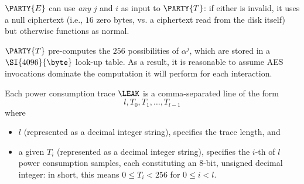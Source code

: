 \begin{itemize}
{      \noindent
      $\PARTY{E}$ can use {\em any} $j$ and $i$ as input to $\PARTY{T}$: if 
      either is invalid, it uses a null ciphertext (i.e., $16$ zero bytes, 
      vs. a ciphertext read from the disk itself) but otherwise functions 
      as normal.
\item $\PARTY{T}$ pre-computes the $256$ possibilities of $\alpha^j$, which 
      are stored in a $\SI{4096}{\byte}$ look-up table.  As a result, it is 
      reasonable to assume AES invocations dominate the computation it will
      perform for each interaction.
}{}%
\item Each power consumption trace $\LEAK$ is a comma-separated line of the 
      form
      \[
      l, T_0, T_1, \ldots, T_{l-1}
      \]
      where
         
      \begin{itemize}
      \item $l$
            (represented as a                       decimal integer string),
            specifies the trace length, 
            and
      \item a given $T_i$ 
            (represented as a                       decimal integer string),
            specifies the $i$-th of $l$ power consumption samples, each 
            constituting an $8$-bit, unsigned decimal integer: in short, 
            this means $0 \leq T_i < 256$ for $0 \leq i < l$.
      \end{itemize}

\end{itemize}


